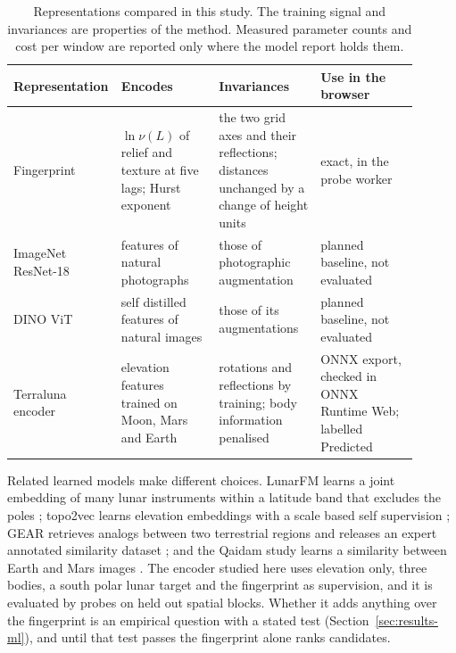 \begin{table}[tbp]
\centering
\caption{Representations compared in this study. The training signal and invariances are
properties of the method. Measured parameter counts and cost per window are reported only where the model report holds them.}
\label{tab:representations}
\footnotesize
\begin{tabular}{@{}p{0.17\linewidth}p{0.24\linewidth}p{0.25\linewidth}p{0.24\linewidth}@{}}
\toprule
Representation & Encodes & Invariances & Use in the browser \\
\midrule
Fingerprint & $\ln \nu(L)$ of relief and texture at five lags; Hurst exponent & the two grid axes and their reflections; distances unchanged by a change of height units & exact, in the probe worker \\
ImageNet ResNet-18 & features of natural photographs & those of photographic augmentation & planned baseline, not evaluated \\
DINO ViT & self distilled features of natural images & those of its augmentations & planned baseline, not evaluated \\
Terraluna encoder & elevation features trained on Moon, Mars and Earth & rotations and reflections by training; body information penalised & ONNX export, checked in ONNX Runtime Web; labelled Predicted \\
\bottomrule
\end{tabular}
\end{table}

Related learned models make different choices. LunarFM learns a joint embedding of many lunar
instruments within a latitude band that excludes the poles \citep{gironamata2026}; topo2vec learns elevation embeddings with a scale based self supervision \citep{kavitzky2021}; GEAR retrieves analogs between two terrestrial regions and releases an expert annotated similarity dataset \citep{liu2026}; and the Qaidam study
learns a similarity between Earth and Mars images \citep{meng2024}. The encoder studied here uses
elevation only, three bodies, a south polar lunar target and the fingerprint as supervision, and it
is evaluated by probes on held out spatial blocks. Whether it adds anything over the fingerprint is
an empirical question with a stated test (Section~\ref{sec:results-ml}), and until that test passes
the fingerprint alone ranks candidates.
